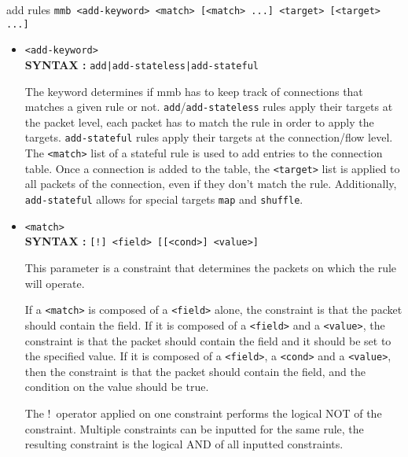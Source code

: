 \documentclass[a4paper,twoside,11pt]{report}
\makeatletter
\renewcommand{\section}{\@startsection{section}{1}{0mm}
  {\baselineskip}%
  {\baselineskip}{\LARGE\color{black}}}%
\makeatother
\begin{document}
\section{add rules}
\texttt{mmb <add-keyword> <match> [<match> ...] <target> [<target> ...]}
\begin{itemize}

\item \texttt{<add-keyword>}\\
   \textbf{SYNTAX :} \texttt{add|add-stateless|add-stateful}

   The keyword determines if mmb has to keep track of connections that matches
   a given rule or not. \texttt{add}/\texttt{add-stateless} rules apply their
   targets at the packet level, each packet has to match the rule in order
   to apply the targets. \texttt{add-stateful} rules apply their targets at the
   connection/flow level. The \texttt{<match>} list of a stateful rule is used
   to add entries to the connection table. Once a connection is added to the table,
   the \texttt{<target>} list is applied to all packets of the connection, even if
   they don't match the rule. Additionally, \texttt{add-stateful} allows for
   special targets \texttt{map} and \texttt{shuffle}.

\item \texttt{<match>} \\
   \textbf{SYNTAX :} \texttt{[!]\ <field> [[<cond>] <value>]}

   This parameter is a constraint that determines the packets on which the
   rule will operate.

   If a \texttt{<match>} is composed of a \texttt{<field>} alone, the constraint
   is that the packet should contain the field. If it is composed of a
   \texttt{<field>} and a \texttt{<value>}, the constraint is that the packet
   should contain the field and it should be set to the specified value. If it
   is composed of a \texttt{<field>}, a \texttt{<cond>} and a \texttt{<value>},
   then the constraint is that the packet should contain the field, and the
   condition on the value should be true.

   The !\ operator applied on one constraint performs the logical NOT of
   the constraint. Multiple constraints can be inputted for the same rule, the
   resulting constraint is the logical AND of all inputted constraints.



\end{itemize}
\end{document}

